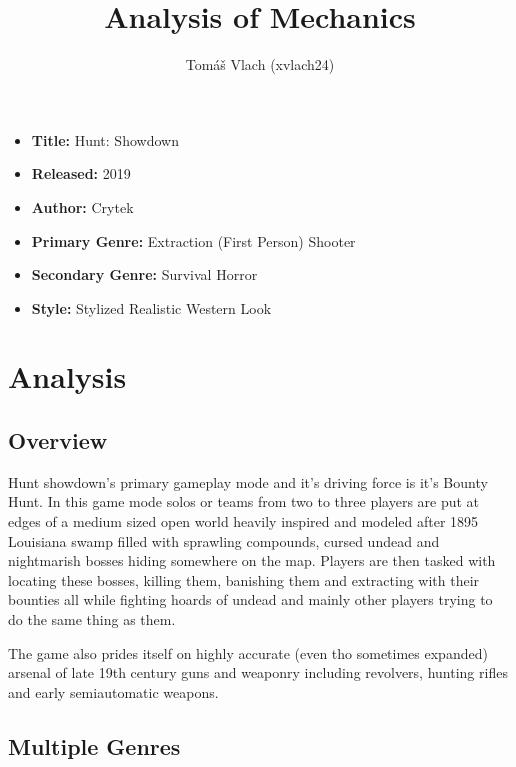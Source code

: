 \documentclass[a4paper,10pt,english]{article}
\title{%
Analysis of Mechanics%
}
\author{%
Tomáš Vlach (xvlach24)%
}
\date{}
\begin{document}
\maketitle
\thispagestyle{empty}

{%
\large

\begin{itemize}

\item[] \textbf{Title:} Hunt: Showdown

\item[] \textbf{Released:} 2019

\item[] \textbf{Author:} Crytek

\item[] \textbf{Primary Genre:} Extraction (First Person) Shooter

\item[] \textbf{Secondary Genre:} Survival Horror

\item[] \textbf{Style:} Stylized Realistic Western Look

\end{itemize}

}

\section*{\centering Analysis}

\subsection*{Overview}

Hunt showdown's primary gameplay mode and it's driving force is it's Bounty Hunt. In this game mode solos or teams from two to three players are put at edges of a medium sized open world heavily inspired and modeled after 1895 Louisiana swamp filled with sprawling compounds, cursed undead and nightmarish bosses hiding somewhere on the map. Players are then tasked with locating these bosses, killing them, banishing them and extracting with their bounties all while fighting hoards of undead and mainly other players trying to do the same thing as them.

The game also prides itself on highly accurate (even tho sometimes expanded) arsenal of late 19th century guns and weaponry including revolvers, hunting rifles and early semiautomatic weapons.

\subsection*{Multiple Genres}
\end{document}
